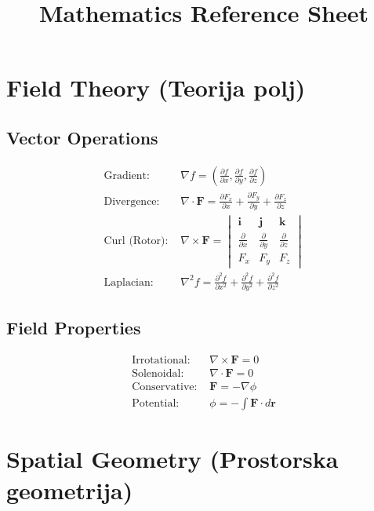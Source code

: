 \documentclass[10pt,twocolumn,a4paper]{article}
\begin{document}
\title{\textbf{Mathematics Reference Sheet}}
\author{}
\date{}
\maketitle

\section{Field Theory (Teorija polj)}

\subsection{Vector Operations}
\begin{align}
\text{Gradient: } &\nabla f = \left(\frac{\partial f}{\partial x}, \frac{\partial f}{\partial y}, \frac{\partial f}{\partial z}\right)\\
\text{Divergence: } &\nabla \cdot \mathbf{F} = \frac{\partial F_x}{\partial x} + \frac{\partial F_y}{\partial y} + \frac{\partial F_z}{\partial z}\\
\text{Curl (Rotor): } &\nabla \times \mathbf{F} = \begin{vmatrix}
\mathbf{i} & \mathbf{j} & \mathbf{k}\\
\frac{\partial}{\partial x} & \frac{\partial}{\partial y} & \frac{\partial}{\partial z}\\
F_x & F_y & F_z
\end{vmatrix}\\
\text{Laplacian: } &\nabla^2 f = \frac{\partial^2 f}{\partial x^2} + \frac{\partial^2 f}{\partial y^2} + \frac{\partial^2 f}{\partial z^2}
\end{align}

\subsection{Field Properties}
\begin{align}
\text{Irrotational: } &\nabla \times \mathbf{F} = 0\\
\text{Solenoidal: } &\nabla \cdot \mathbf{F} = 0\\
\text{Conservative: } &\mathbf{F} = -\nabla \phi\\
\text{Potential: } &\phi = -\int \mathbf{F} \cdot d\mathbf{r}
\end{align}

\section{Spatial Geometry (Prostorska geometrija)}
\end{document}

